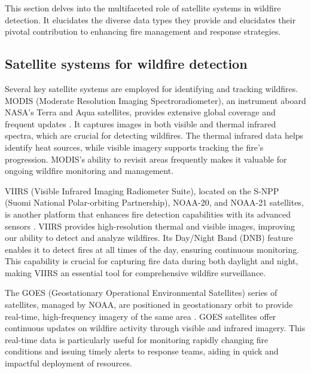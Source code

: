 \documentclass[
  12 pt,
]{Nemilov}
\begin{document}
This section delves into the multifaceted role of satellite systems in wildfire detection. It elucidates the diverse data types they provide and elucidates their pivotal contribution to enhancing fire management and response strategies.

\subsection{Satellite systems for wildfire detection}\label{satellite-systems-for-wildfire-detection}

Several key satellite systems are employed for identifying and tracking wildfires. MODIS (Moderate Resolution Imaging Spectroradiometer), an instrument aboard NASA's Terra and Aqua satellites, provides extensive global coverage and frequent updates \citep{davies2008fire}. It captures images in both visible and thermal infrared spectra, which are crucial for detecting wildfires. The thermal infrared data helps identify heat sources, while visible imagery supports tracking the fire's progression. MODIS's ability to revisit areas frequently makes it valuable for ongoing wildfire monitoring and management.

VIIRS (Visible Infrared Imaging Radiometer Suite), located on the S-NPP (Suomi National Polar-orbiting Partnership), NOAA-20, and NOAA-21 satellites, is another platform that enhances fire detection capabilities with its advanced sensors \citep{dalezios2017wildfires}. VIIRS provides high-resolution thermal and visible images, improving our ability to detect and analyze wildfires. Its Day/Night Band (DNB) feature enables it to detect fires at all times of the day, ensuring continuous monitoring. This capability is crucial for capturing fire data during both daylight and night, making VIIRS an essential tool for comprehensive wildfire surveillance.

The GOES (Geostationary Operational Environmental Satellites) series of satellites, managed by NOAA, are positioned in geostationary orbit to provide real-time, high-frequency imagery of the same area \citep{chuvieco2020satellite, prins2001overview}. GOES satellites offer continuous updates on wildfire activity through visible and infrared imagery. This real-time data is particularly useful for monitoring rapidly changing fire conditions and issuing timely alerts to response teams, aiding in quick and impactful deployment of resources.
\end{document}
